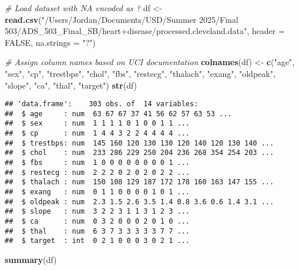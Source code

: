 \documentclass[
]{article}
\newenvironment{Shaded}{\begin{snugshade}}{\end{snugshade}}
\newcommand{\AttributeTok}[1]{\textcolor[rgb]{0.13,0.29,0.53}{#1}}
\newcommand{\CommentTok}[1]{\textcolor[rgb]{0.56,0.35,0.01}{\textit{#1}}}
\newcommand{\ConstantTok}[1]{\textcolor[rgb]{0.56,0.35,0.01}{#1}}
\newcommand{\FunctionTok}[1]{\textcolor[rgb]{0.13,0.29,0.53}{\textbf{#1}}}
\newcommand{\NormalTok}[1]{#1}
\newcommand{\OtherTok}[1]{\textcolor[rgb]{0.56,0.35,0.01}{#1}}
\newcommand{\StringTok}[1]{\textcolor[rgb]{0.31,0.60,0.02}{#1}}
\begin{document}
\begin{Shaded}
\begin{Highlighting}[]
\CommentTok{\# Load dataset with NA encoded as \textquotesingle{}?\textquotesingle{}}
\NormalTok{df }\OtherTok{\textless{}{-}} \FunctionTok{read.csv}\NormalTok{(}\StringTok{"/Users/Jordan/Documents/USD/Summer 2025/Final 503/ADS\_503\_Final\_SB/heart+disease/processed.cleveland.data"}\NormalTok{,}
\AttributeTok{header =} \ConstantTok{FALSE}\NormalTok{, }\AttributeTok{na.strings =} \StringTok{"?"}\NormalTok{)}

\CommentTok{\# Assign column names based on UCI documentation}
\FunctionTok{colnames}\NormalTok{(df) }\OtherTok{\textless{}{-}} \FunctionTok{c}\NormalTok{(}\StringTok{"age"}\NormalTok{, }\StringTok{"sex"}\NormalTok{, }\StringTok{"cp"}\NormalTok{, }\StringTok{"trestbps"}\NormalTok{, }\StringTok{"chol"}\NormalTok{, }\StringTok{"fbs"}\NormalTok{, }\StringTok{"restecg"}\NormalTok{,}
                  \StringTok{"thalach"}\NormalTok{, }\StringTok{"exang"}\NormalTok{, }\StringTok{"oldpeak"}\NormalTok{, }\StringTok{"slope"}\NormalTok{, }\StringTok{"ca"}\NormalTok{, }\StringTok{"thal"}\NormalTok{, }\StringTok{"target"}\NormalTok{)}
\FunctionTok{str}\NormalTok{(df)}
\end{Highlighting}
\end{Shaded}

\begin{verbatim}
## 'data.frame':    303 obs. of  14 variables:
##  $ age     : num  63 67 67 37 41 56 62 57 63 53 ...
##  $ sex     : num  1 1 1 1 0 1 0 0 1 1 ...
##  $ cp      : num  1 4 4 3 2 2 4 4 4 4 ...
##  $ trestbps: num  145 160 120 130 130 120 140 120 130 140 ...
##  $ chol    : num  233 286 229 250 204 236 268 354 254 203 ...
##  $ fbs     : num  1 0 0 0 0 0 0 0 0 1 ...
##  $ restecg : num  2 2 2 0 2 0 2 0 2 2 ...
##  $ thalach : num  150 108 129 187 172 178 160 163 147 155 ...
##  $ exang   : num  0 1 1 0 0 0 0 1 0 1 ...
##  $ oldpeak : num  2.3 1.5 2.6 3.5 1.4 0.8 3.6 0.6 1.4 3.1 ...
##  $ slope   : num  3 2 2 3 1 1 3 1 2 3 ...
##  $ ca      : num  0 3 2 0 0 0 2 0 1 0 ...
##  $ thal    : num  6 3 7 3 3 3 3 3 7 7 ...
##  $ target  : int  0 2 1 0 0 0 3 0 2 1 ...
\end{verbatim}

\begin{Shaded}
\begin{Highlighting}[]
\FunctionTok{summary}\NormalTok{(df)}
\end{Highlighting}
\end{Shaded}
\end{document}
